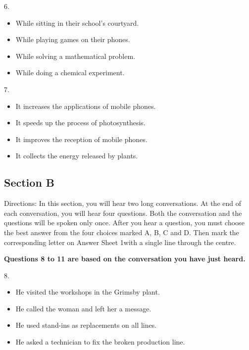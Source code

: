 \documentclass[UTF8,11pt]{ctexart}
\begin{document}
6.


\begin{itemize}[leftmargin=2em,itemsep=.2em,topsep=.4em]\item[A.] While sitting in their school's courtyard.
\item[B.] While playing games on their phones.
\item[C.] While solving a mathematical problem.
\item[D.] While doing a chemical experiment.
\end{itemize}

7.


\begin{itemize}[leftmargin=2em,itemsep=.2em,topsep=.4em]\item[A.] It increases the applications of mobile phones.
\item[B.] It speeds up the process of photosynthesis.
\item[C.] It improves the reception of mobile phones.
\item[D.] It collects the energy released by plants.
\end{itemize}

\subsection*{\textbf{Section B}}


Directions: In this section, you will hear two long conversations. At the end of each conversation, you will hear four questions. Both the conversation and the questions will be spoken only once. After you hear a question, you must choose the best answer from the four choices marked A, B, C and D. Then mark the corresponding letter on Answer Sheet 1with a single line through the centre.


\textbf{Questions 8 to 11 are based on the conversation you have just heard.}


8.


\begin{itemize}[leftmargin=2em,itemsep=.2em,topsep=.4em]\item[A.] He visited the workshops in the Grimsby plant.
\item[B.] He called the woman and left her a message.
\item[C.] He used stand-ins as replacements on all lines.
\item[D.] He asked a technician to fix the broken production line.
\end{itemize}
\end{document}
